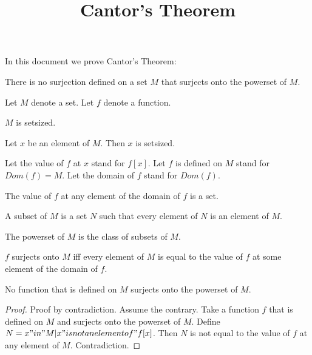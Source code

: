 \documentclass{document}
\title{Cantor's Theorem}
\author{}
\date{}
\begin{document}

  \maketitle

  In this document we prove Cantor's Theorem:

  \begin{theorem}
    There is no surjection defined on a set $M$ that surjects onto the powerset of $M$.
  \end{theorem}

  \begin{forthel}

    Let $M$ denote a set. Let $f$ denote a function.

    \begin{axiom}
        $M$ is setsized.
    \end{axiom}

    \begin{axiom}
        Let $x$ be an element of $M$. Then $x$ is setsized.
    \end{axiom}

    Let the value of $f$ at $x$ stand for $f[x]$. Let $f$ is defined on $M$ stand for $Dom(f) = M$. Let the domain of $f$ stand for $Dom(f)$.


    \begin{axiom}
      The value of $f$ at any element of the domain of $f$ is a set.
    \end{axiom}

    \begin{definition}[subset]
      A subset of $M$ is a set $N$ such that every element of $N$ is an element of $M$.
    \end{definition}

    \begin{definition}
      The powerset of $M$ is the class of subsets of $M$.
    \end{definition}

    \begin{definition}
      $f$ surjects onto $M$ iff every element of $M$ is equal to the value of $f$ at some element of the domain of $f$.
    \end{definition}

    \begin{proposition}
      No function that is defined on $M$ surjects onto the powerset of $M$.
    \end{proposition}
    \begin{proof}
      Proof by contradiction. Assume the contrary. Take a function $f$ that is defined on $M$ and surjects onto the powerset of $M$. Define $N = {x "in" M | x "is not an element of" f[x]}$. Then $N$ is not equal to the value of $f$ at any element of $M$. Contradiction.
    \end{proof}

  \end{forthel}
\end{document}
